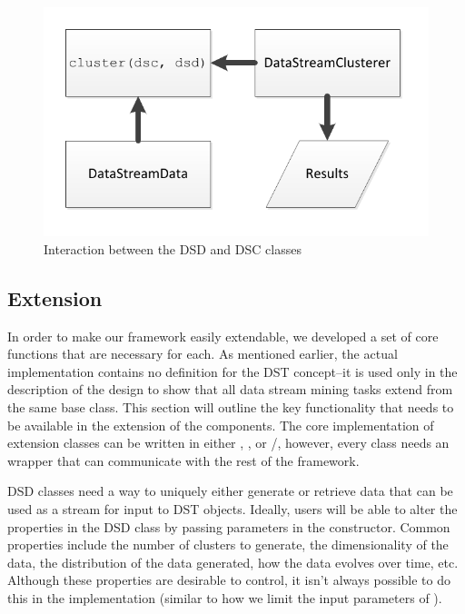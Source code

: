 \documentclass[nojss]{jss}
\begin{document}
\begin{figure}
\centering
\includegraphics{interaction}
\caption{Interaction between the DSD and DSC classes}
\label{figure:interaction}
\end{figure}

\subsection{Extension}
\label{sec:design:extension}

In order to make our framework easily extendable, we developed a set of core functions that are necessary for each. As mentioned earlier, the actual  implementation contains no definition for the DST concept--it is used only in the description of the design to show that all data stream mining tasks extend from the same base class. This section will outline the key functionality that needs to be available in the extension of the  components. The core implementation of extension classes can be written in either , , or /, however, every class needs an  wrapper that can communicate with the rest of the framework.


DSD classes need a way to uniquely either generate or retrieve data that can be used as a stream for input to DST objects. Ideally, users will be able to alter the properties in the DSD class by passing parameters in the constructor. Common properties include the number of clusters to generate, the dimensionality of the data, the distribution of the data generated, how the data evolves over time, etc. Although these properties are desirable to control, it isn't always possible to do this in the implementation (similar to how we limit the input parameters of ). 
\end{document}
